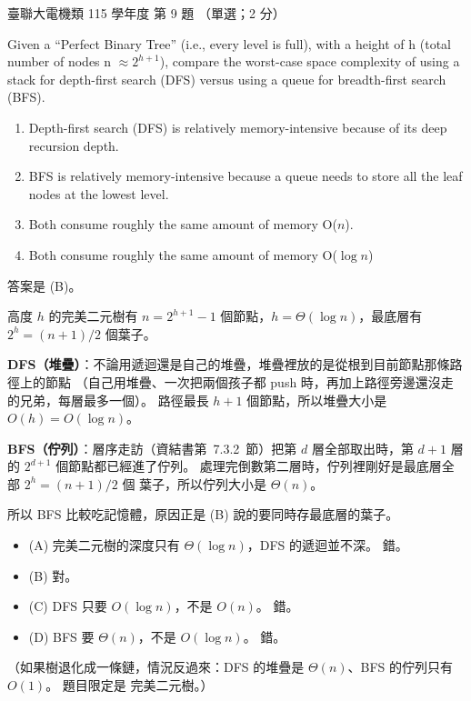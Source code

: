 \begin{pastexam}[label={px:ust-115-ee-ds-09}]{臺聯大電機類 115 學年度 第 9 題}
（單選；2 分）

Given a ``Perfect Binary Tree'' (i.e., every level is full), with a height of h (total number of
nodes n $\approx 2^{h+1}$), compare the worst-case space complexity of using a stack for depth-first
search (DFS) versus using a queue for breadth-first search (BFS).
\begin{enumerate}[label=(\Alph*)]
\item Depth-first search (DFS) is relatively memory-intensive because of its deep recursion depth.
\item BFS is relatively memory-intensive because a queue needs to store all the leaf nodes at the
lowest level.
\item Both consume roughly the same amount of memory O($n$).
\item Both consume roughly the same amount of memory O($\log n$)
\end{enumerate}
\end{pastexam}

\begin{pastsoln}
答案是 (B)。

高度 $h$ 的完美二元樹有 $n = 2^{h+1} - 1$ 個節點，$h = \Theta(\log n)$，最底層有
$2^h = (n + 1)/2$ 個葉子。

\textbf{DFS（堆疊）}：不論用遞迴還是自己的堆疊，堆疊裡放的是從根到目前節點那條路徑上的節點
（自己用堆疊、一次把兩個孩子都 push 時，再加上路徑旁邊還沒走的兄弟，每層最多一個）。 路徑最長
$h + 1$ 個節點，所以堆疊大小是 $O(h) = O(\log n)$。

\textbf{BFS（佇列）}：層序走訪（資結書第~7.3.2~節）把第 $d$ 層全部取出時，第 $d + 1$ 層的
$2^{d+1}$ 個節點都已經進了佇列。 處理完倒數第二層時，佇列裡剛好是最底層全部 $2^h = (n+1)/2$ 個
葉子，所以佇列大小是 $\Theta(n)$。

所以 BFS 比較吃記憶體，原因正是 (B) 說的要同時存最底層的葉子。
\begin{itemize}
\item (A) 完美二元樹的深度只有 $\Theta(\log n)$，DFS 的遞迴並不深。 錯。
\item (B) 對。
\item (C) DFS 只要 $O(\log n)$，不是 $O(n)$。 錯。
\item (D) BFS 要 $\Theta(n)$，不是 $O(\log n)$。 錯。
\end{itemize}
（如果樹退化成一條鏈，情況反過來：DFS 的堆疊是 $\Theta(n)$、BFS 的佇列只有 $O(1)$。 題目限定是
完美二元樹。）
\end{pastsoln}
